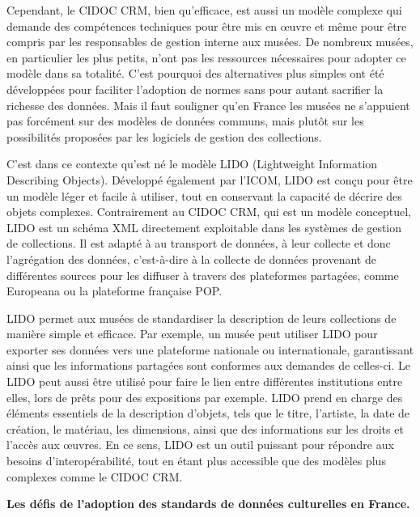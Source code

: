 Cependant, le CIDOC CRM, bien qu’efficace, est aussi un modèle complexe qui demande des compétences techniques pour être mis en œuvre et même pour être compris par les responsables de gestion interne aux musées. De nombreux musées, en particulier les plus petits, n’ont pas les ressources nécessaires pour adopter ce modèle dans sa totalité. C’est pourquoi des alternatives plus simples ont été développées pour faciliter l’adoption de normes sans pour autant sacrifier la richesse des données. Mais il faut souligner qu’en France les musées ne s’appuient pas forcément sur des modèles de données communs, mais plutôt sur les possibilités proposées par les logiciels de gestion des collections. \newline

C’est dans ce contexte qu’est né le modèle LIDO (Lightweight Information Describing Objects). Développé également par l’ICOM, LIDO est conçu pour être un modèle léger et facile à utiliser, tout en conservant la capacité de décrire des objets complexes. Contrairement au CIDOC CRM, qui est un modèle conceptuel, LIDO est un schéma XML directement exploitable dans les systèmes de gestion de collections. Il est adapté à au transport de données, à leur collecte et donc l’agrégation des données, c’est-à-dire à la collecte de données provenant de différentes sources pour les diffuser à travers des plateformes partagées, comme Europeana ou la plateforme française POP.\newline

LIDO permet aux musées de standardiser la description de leurs collections de manière simple et efficace. Par exemple, un musée peut utiliser LIDO pour exporter ses données vers une plateforme nationale ou internationale, garantissant ainsi que les informations partagées sont conformes aux demandes de celles-ci. Le LIDO peut aussi être utilisé pour faire le lien entre différentes institutions entre elles, lors de prêts pour des expositions par exemple. LIDO prend en charge des éléments essentiels de la description d’objets, tels que le titre, l’artiste, la date de création, le matériau, les dimensions, ainsi que des informations sur les droits et l’accès aux œuvres. En ce sens, LIDO est un outil puissant pour répondre aux besoins d’interopérabilité, tout en étant plus accessible que des modèles plus complexes comme le CIDOC CRM. \newline

\textbf{Les défis de l’adoption des standards de données culturelles en France.}\newline

